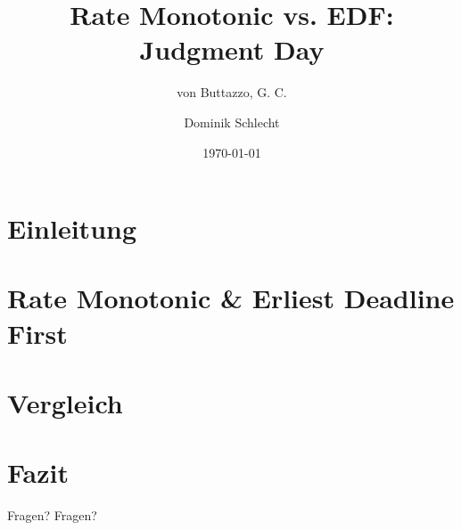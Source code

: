 \documentclass[unknownkeysallowed]{beamer}
\title{Rate Monotonic vs. EDF: Judgment Day}
\subtitle{von Buttazzo, G. C.}
\date{\today}
\author{Dominik Schlecht}
\institute[THI]{Technische Hochschule Ingolstadt}
\newcounter{ct}
\begin{document}
	\frame{\maketitle}
	\frame{\tableofcontents[hideallsubsections]}
	
	
	\section{Einleitung}
	
	
	\section{Rate Monotonic \& Erliest Deadline First}
	
	
	\section{Vergleich}
	
	
	\section{Fazit}
	
	
	\begin{frame}{Fragen?}
		Fragen?
	\end{frame}
	
\end{document}
